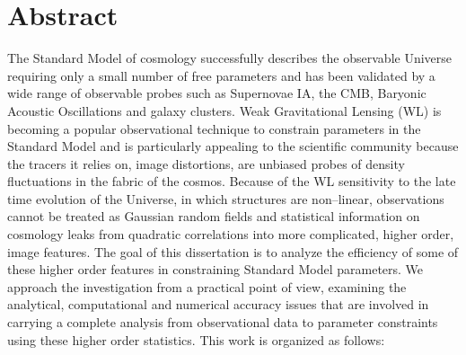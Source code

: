 \chapter*{Abstract} 

The Standard Model of cosmology successfully describes the observable Universe requiring only a small number of free parameters and has been validated by a wide range of observable probes such as Supernovae IA, the CMB, Baryonic Acoustic Oscillations and galaxy clusters. Weak Gravitational Lensing (WL) is becoming a popular observational technique to constrain parameters in the Standard Model and is particularly appealing to the scientific community because the tracers it relies on, image distortions, are unbiased probes of density fluctuations in the fabric of the cosmos. Because of the WL sensitivity to the late time evolution of the Universe, in which structures are non--linear, observations cannot be treated as Gaussian random fields and statistical information on cosmology leaks from quadratic correlations into more complicated, higher order, image features. The goal of this dissertation is to analyze the efficiency of some of these higher order features in constraining Standard Model parameters. We approach the investigation from a practical point of view, examining the analytical, computational and numerical accuracy issues that are involved in carrying a complete analysis from observational data to parameter constraints using these higher order statistics. This work is organized as follows:

